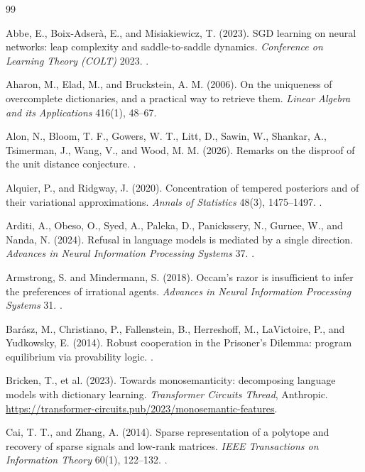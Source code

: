\begin{thebibliography}{99}


 Abbe, E., Boix-Adser\`a, E., and Misiakiewicz, T. (2023). SGD learning on neural networks: leap complexity and saddle-to-saddle dynamics. \emph{Conference on Learning Theory (COLT)} 2023. .

 Aharon, M., Elad, M., and Bruckstein, A. M. (2006). On the uniqueness of overcomplete dictionaries, and a practical way to retrieve them. \emph{Linear Algebra and its Applications} 416(1), 48--67.

 Alon, N., Bloom, T. F., Gowers, W. T., Litt, D., Sawin, W., Shankar, A., Tsimerman, J., Wang, V., and Wood, M. M. (2026). Remarks on the disproof of the unit distance conjecture. .

 Alquier, P., and Ridgway, J. (2020). Concentration of tempered posteriors and of their variational approximations. \emph{Annals of Statistics} 48(3), 1475--1497. .

 Arditi, A., Obeso, O., Syed, A., Paleka, D., Panickssery, N., Gurnee, W., and Nanda, N. (2024). Refusal in language models is mediated by a single direction. \emph{Advances in Neural Information Processing Systems} 37. .

 Armstrong, S. and Mindermann, S. (2018). Occam's razor is insufficient to infer the preferences of irrational agents. \emph{Advances in Neural Information Processing Systems} 31. .



 Bar\'asz, M., Christiano, P., Fallenstein, B., Herreshoff, M., LaVictoire, P., and Yudkowsky, E. (2014). Robust cooperation in the Prisoner's Dilemma: program equilibrium via provability logic. .


 Bricken, T., et al. (2023). Towards monosemanticity: decomposing language models with dictionary learning. \emph{Transformer Circuits Thread}, Anthropic. \url{https://transformer-circuits.pub/2023/monosemantic-features}.



 Cai, T. T., and Zhang, A. (2014). Sparse representation of a polytope and recovery of sparse signals and low-rank matrices. \emph{IEEE Transactions on Information Theory} 60(1), 122--132. .


\end{thebibliography}
